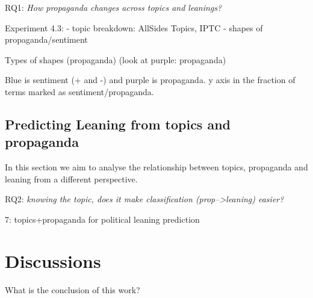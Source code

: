 RQ1: \emph{How propaganda changes across topics and leanings?}

Experiment 4.3: 
- topic breakdown: AllSides Topics, IPTC
- shapes of propaganda/sentiment


Types of shapes (propaganda)
(look at purple: propaganda)

Blue is sentiment (+ and -) and purple is propaganda. 
y axis in the fraction of terms marked as sentiment/propaganda.

\subsection{Predicting Leaning from topics and propaganda}

In this section we aim to analyse the relationship between topics, propaganda and leaning from a different perspective.

RQ2: \emph{knowing the topic, does it make classification (prop-->leaning) easier?}

7: topics+propaganda for political leaning prediction


\section{Discussions}

What is the conclusion of this work?